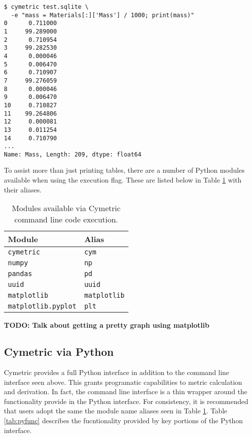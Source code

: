 \documentclass{anstrans}
\newcommand{\TODO}[1] {{\color{red}\textbf{TODO: #1}}}
\newcommand{\code}[1]{{\color{code}\texttt{#1}}}
\begin{document}
\begin{lstlisting}[caption ={Calculating and Manipulating Metrics}, label=mass]
$ cymetric test.sqlite \
  -e "mass = Materials[:]['Mass'] / 1000; print(mass)"
0      0.711000
1     99.289000
2      0.710954
3     99.282530
4      0.000046
5      0.006470
6      0.710907
7     99.276059
8      0.000046
9      0.006470
10     0.710827
11    99.264806
12     0.000081
13     0.011254
14     0.710790
...
Name: Mass, Length: 209, dtype: float64
\end{lstlisting}

To assist more than just printing tables, there are a number of Python 
modules available when using the execution flag. These are listed below 
in Table \ref{tab:modules} with their aliases.

\begin{table}[htb]
  \centering
\begin{tabular}{ll}
\toprule
  Module                   & Alias \\
\midrule
  \code{cymetric}          & \code {cym} \\
  \code{numpy}             & \code{np} \\  
  \code{pandas}            & \code{pd} \\
  \code{uuid}              & \code{uuid} \\
  \code{matplotlib}        & \code{matplotlib} \\
  \code{matplotlib.pyplot} & \code{plt} \\
\bottomrule
\end{tabular}
  \caption{Modules available via Cymetric command line code execution.}
  \label{tab:modules}
\end{table}

\TODO{Talk about getting a pretty graph using matplotlib}

\subsection{Cymetric via Python}
Cymetric provides a full Python interface in addition to the command line 
interface seen above. This grants programatic capabilities to metric 
calculation and derivation. In fact, the command line interface is a thin
wrapper around the functionality provide in the Python interface.
For consistency, it is recommended that users adopt the same the module name 
aliases seen in Table \ref{tab:modules}. 
Table \ref{tab:pyfunc} describes the fucntionality provided by key 
portions of the Python interface.
\end{document}
